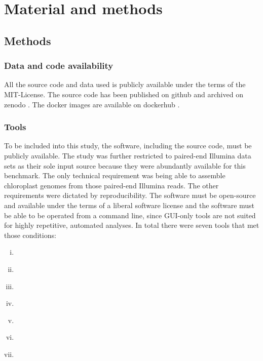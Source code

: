 \section{Material and methods}
\subsection{Methods}
\subsubsection{Data and code availability}
All the source code and data used is publicly available under the terms of the MIT-License. The source code
has been published on github \cite{github-benchmark-repo} and archived on zenodo \cite{zenodorepo} . The
docker images are available on dockerhub \cite{dockerhub-benchmark}.

\subsubsection{Tools}
To be included into this study, the software, including the source code, must be publicly
available. The study was further restricted to paired-end Illumina data sets as their sole
input source because they were abundantly available for this benchmark.  The only
technical requirement was being able to assemble chloroplast genomes from those paired-end
Illumina reads. The other requirements were dictated by reproducibility. The software must
be open-source and available under the terms of a liberal software license and the
software must be able to be operated from a command line, since GUI-only tools are not
suited for highly repetitive, automated analyses. In total there were seven tools that met
those conditions:

\begin{enumerate}[(i)]
\item \ce \hspace{0.25ex} \cite{j_ankenbrand_chloroextractor:_2018}
\item \cassp \hspace{0.25ex} \cite{sancho_comparative_2018}
\item \go \hspace{0.25ex} \cite{jin_getorganelle:_2018}
\item \oa \hspace{0.25ex} \cite{coissac_barcodes_2016}
\item \ioga \hspace{0.25ex} \cite{bakker_herbarium_2016}
\item \fp \hspace{0.25ex} \cite{mckain__fast-plast_2017}
\item \np \hspace{0.25ex} \cite{dierckxsens_novoplasty:_2017}
\end{enumerate}


